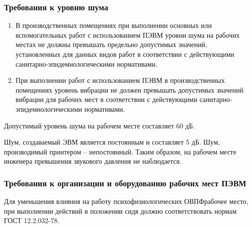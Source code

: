 \subsubsection{Требования к уровню шума}
\begin{enumerate}
\item В производственных помещениях при выполнении основных или вспомогательных работ с использованием ПЭВМ уровни шума на рабочих местах не должны превышать предельно допустимых значений, установленных для данных видов работ в соответствии с действующими санитарно-эпидемиологическими нормативами. 
\item При выполнении работ с использованием ПЭВМ в производственных помещениях уровень вибрации не должен превышать допустимых значений вибрации для рабочих мест в соответствии с действующими санитарно-эпидемиологическими нормативами.
\end{enumerate}

Допустимый уровень шума на рабочем месте составляет 60 дБ.

Шум, создаваемый ЭВМ является постоянным и составляет 5 дБ. Шум, производимый принтером – непостоянный. Таким образом, на рабочем месте инженера превышения звукового давления не наблюдается.
\subsubsection{Требования к организации и оборудованию рабочих мест ПЭВМ}
Для уменьшения влияния на работу психофизиологических ОВПФрабочее место, при выполнении действий в положении сидя должно соответствовать нормам ГОСТ 12.2.032-78.

